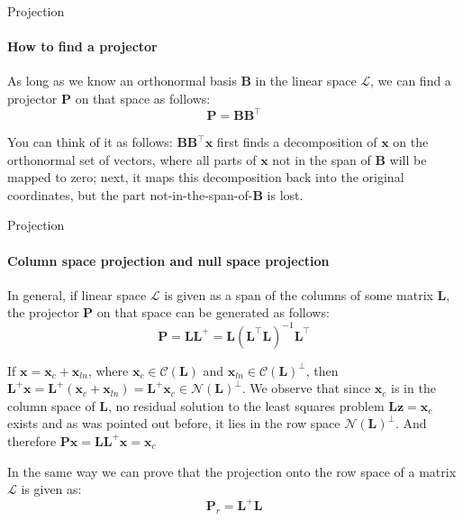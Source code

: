 \documentclass{beamer}
\begin{document}
\begin{frame}{Projection}
\framesubtitle{How to find a projector}
\begin{flushleft}

As long as we know an orthonormal basis $\mathbf{B}$ in the linear space $\mathcal{L}$, we can find a projector $\mathbf{P}$ on that space as follows:
%
\begin{equation}
    \mathbf{P} = \mathbf{B} \mathbf{B}^\top
\end{equation}

You can think of it as follows: $\mathbf{B} \mathbf{B}^\top \mathbf{x}$ first finds a decomposition of $\mathbf{x}$ on the orthonormal set of vectors, where all parts of $\mathbf{x}$ not in the span of $\mathbf{B}$ will be mapped to zero; next, it maps this decomposition back into the original coordinates, but the part not-in-the-span-of-$\mathbf{B}$ is lost.


\end{flushleft}
\end{frame}




\begin{frame}{Projection}
\framesubtitle{Column space projection and null space projection}
\begin{flushleft}


In general, if linear space $\mathcal{L}$ is given as a span of the columns of some matrix $\mathbf{L}$, the projector $\mathbf{P}$ on that space can be generated as follows:
%
\begin{equation}
    \mathbf{P} = \mathbf{L} \mathbf{L}^+ = \mathbf{L} (\mathbf{L}^\top \mathbf{L})^{-1} \mathbf{L}^\top
\end{equation}

If $\mathbf{x}  = \mathbf{x}_c + \mathbf{x}_{ln}$, where $\mathbf{x}_c \in \mathcal{C}(\mathbf{L})$ and $\mathbf{x}_{ln} \in \mathcal{C}(\mathbf{L})^\perp$, then $\mathbf{L}^+ \mathbf{x} = \mathbf{L}^+ (\mathbf{x}_c + \mathbf{x}_{ln}) = \mathbf{L}^+\mathbf{x}_c \in \mathcal{N}(\mathbf{L})^\perp$. We observe that since $\mathbf{x}_c$ is in the column space of $\mathbf{L}$, no residual solution to the least squares problem $\mathbf{L}\mathbf{z} = \mathbf{x}_c$ exists and as was pointed out before, it lies in the row space $\mathcal{N}(\mathbf{L})^\perp$. And therefore $\mathbf{P}\mathbf{x} = \mathbf{L} \mathbf{L}^+\mathbf{x} = \mathbf{x}_c$

\bigskip

In the same way we can prove that the projection onto the row space of a matrix $\mathcal{L}$ is given as:
%
\begin{equation}
    \mathbf{P}_{r} = \mathbf{L}^+ \mathbf{L}
\end{equation}


\end{flushleft}
\end{frame}
\end{document}
